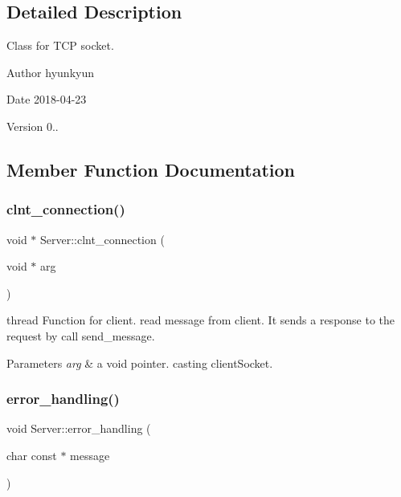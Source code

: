 \subsection{Detailed Description}
Class for T\+CP socket. 

\begin{DoxyAuthor}{Author}
hyunkyun 
\end{DoxyAuthor}
\begin{DoxyDate}{Date}
2018-\/04-\/23 
\end{DoxyDate}
\begin{DoxyVersion}{Version}
0.. 
\end{DoxyVersion}


\subsection{Member Function Documentation}
\mbox{\label{class_server_a4adbe902c237615f2ec2ecc21e0f4dfa}} 
\subsubsection{\texorpdfstring{clnt\+\_\+connection()}{clnt\_connection()}}
{\footnotesize\ttfamily void $\ast$ Server\+::clnt\+\_\+connection (\begin{DoxyParamCaption}\item[{void $\ast$}]{arg }\end{DoxyParamCaption})}



thread Function for client. read message from client. It sends a response to the request by call send\+\_\+message. 


\begin{DoxyParams}{Parameters}
{\em arg} & a void pointer. casting client\+Socket. \\
\hline
\end{DoxyParams}
\mbox{\label{class_server_ab07824cba6467208a7243bacc7073ff4}} 
\subsubsection{\texorpdfstring{error\+\_\+handling()}{error\_handling()}}
{\footnotesize\ttfamily void Server\+::error\+\_\+handling (\begin{DoxyParamCaption}\item[{char const $\ast$}]{message }\end{DoxyParamCaption})}



